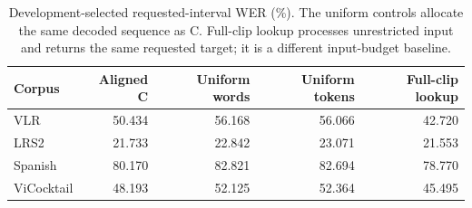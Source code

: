 \begin{table}[tb]
\centering\small
\caption{Development-selected requested-interval WER (\%). The uniform controls allocate the same decoded sequence as C. Full-clip lookup processes unrestricted input and returns the same requested target; it is a different input-budget baseline.}
\label{tab:allocation}
\begin{tabular}{lrrrr}
\toprule
Corpus & Aligned C & Uniform words & Uniform tokens & Full-clip lookup \\
\midrule
VLR & 50.434 & 56.168 & 56.066 & 42.720 \\
LRS2 & 21.733 & 22.842 & 23.071 & 21.553 \\
Spanish & 80.170 & 82.821 & 82.694 & 78.770 \\
ViCocktail & 48.193 & 52.125 & 52.364 & 45.495 \\
\bottomrule
\end{tabular}
\end{table}
